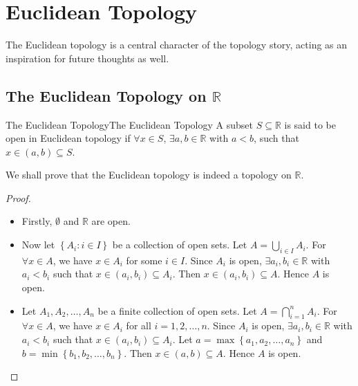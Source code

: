 \documentclass[../main.tex]{subfiles}
\begin{document}
\chapter{Euclidean Topology}

The Euclidean topology is a central character of the topology story, acting as an inspiration for future thoughts as well.

\section{The Euclidean Topology on $\mathbb{R}$}
\begin{definition}{The Euclidean Topology}{The Euclidean Topology}
A subset $S \subseteq \mathbb{R}$ is said to be open in Euclidean topology if $\forall x \in S$, $\exists a,b\in \mathbb{R}$ with $a<b$, such that $x\in (a,b) \subseteq S$.
\end{definition}
We shall prove that the Euclidean topology is indeed a topology on $\mathbb{R}$.
\begin{proof}
\begin{itemize}
\item Firstly, $\emptyset $ and $\mathbb{R}$ are open.
\item Now let $\left\{ A_i : i\in I \right\}$ be a collection of open sets. Let $A = \bigcup_{i\in I} A_i$. For $\forall x\in A$, we have $x\in A_i$ for some $i\in I$. Since $A_i$ is open, $\exists a_i, b_i \in \mathbb{R}$ with $a_i < b_i$ such that $x\in (a_i, b_i) \subseteq A_i$. Then $x\in (a_i, b_i) \subseteq A$. Hence $A$ is open.
\item Let $A_1, A_2, \ldots, A_n$ be a finite collection of open sets. Let $A = \bigcap_{i=1}^n A_i$. For $\forall x\in A$, we have $x\in A_i$ for all $i=1,2,\ldots,n$. Since $A_i$ is open, $\exists a_i, b_i \in \mathbb{R}$ with $a_i < b_i$ such that $x\in (a_i, b_i) \subseteq A_i$. Let $a = \max\left\{ a_1, a_2, \ldots, a_n \right\}$ and $b = \min\left\{ b_1, b_2, \ldots, b_n \right\}$. Then $x\in (a, b) \subseteq A$. Hence $A$ is open.
\end{itemize}
\end{proof}
\end{document}
